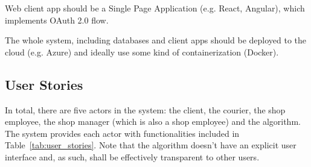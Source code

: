 \documentclass[../main.tex]{subfiles}
\begin{document}
\begin{itemize}
Web client app should be a Single Page Application (e.g. React, Angular), which implements OAuth 2.0 flow.

The whole system, including databases and client apps should be deployed to the cloud (e.g. Azure) and ideally use some kind of containerization (Docker).

\subsection{User Stories}

In total, there are five actors in the system: the client, the courier, the shop employee, the shop manager (which is also a shop employee) and the algorithm. The system provides each actor with functionalities included in Table~\ref{tab:user_stories}. Note that the algorithm doesn't have an explicit user interface and, as such, shall be effectively transparent to other users. 


\end{itemize}
\end{document}

